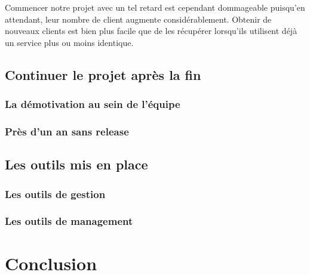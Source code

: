 \documentclass{article}
\begin{document}
		Commencer notre projet avec un tel retard est cependant dommageable puisqu'en attendant, leur nombre de client augmente considérablement. Obtenir de nouveaux clients est bien plus facile que de les récupérer lorsqu'ils utilisent déjà un service plus ou moins identique.
\subsection{Continuer le projet après la fin}
\subsubsection{La démotivation au sein de l'équipe}
\subsubsection{Près d'un an sans release}
\subsection{Les outils mis en place}
\subsubsection{Les outils de gestion}
\subsubsection{Les outils de management}

\section{Conclusion}
\end{document}
